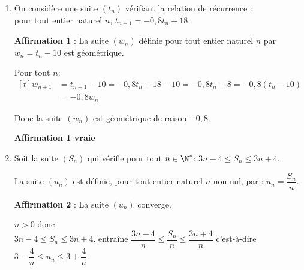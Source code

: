 
%

\smallskip


\begin{enumerate}
\item On considère une suite $\left(t_n\right)$ vérifiant la relation de récurrence : \\
pour tout entier naturel $n$, $t_{n+1}= - 0,8t_n + 18.$

	\textbf{Affirmation 1} : La suite $\left(w_n\right)$ définie pour tout entier naturel $n$ par $w_n = t_n - 10$ est géométrique.

\smallskip
	
Pour tout $n$: 
$\begin{aligned}[t]
w_{n  +1} & =t_{n+1}-10 = -0,8 t_n +18 - 10 = -0,8t_n +8 = -0,8\left ( t_n-10\right)\\
&  = -0,8 w_n
\end{aligned}$

Donc la suite $(w_n)$ est géométrique de raison $-0,8$.
	
\hfill{\blue\bf Affirmation 1 vraie}	
	
\item Soit la suite $\left(S_n\right)$ qui vérifie pour tout $n\in \N^*$: $3n - 4 \leqslant S_n \leqslant 3n + 4.$

	La suite $\left(u_n\right)$ est définie, pour tout entier naturel $n$ non nul, par : $u_n=\dfrac{S_n}{n}$.
	
	\textbf{Affirmation 2} : La suite $\left(u_n\right)$ converge.
	
	\smallskip

$n>0$ donc \\
$3n - 4 \leqslant S_n \leqslant 3n + 4.$ entraîne $\dfrac{3n - 4}{n} \leqslant \dfrac{S_n}{n} \leqslant \dfrac{3n + 4}{n}$ c'est-à-dire
$3-\dfrac{4}{n} \leqslant u_n \leqslant 3+\dfrac{4}{n}$.



\end{enumerate}
